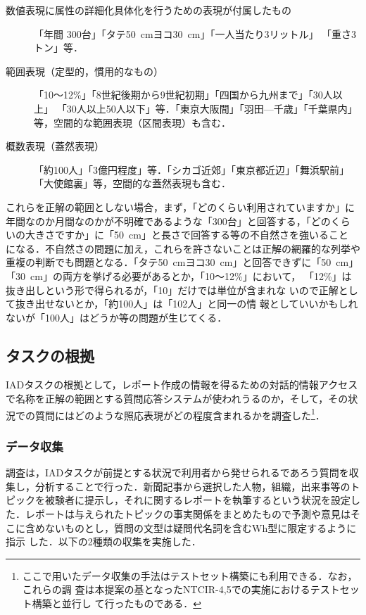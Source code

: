 \documentclass[japanese]{jnlp_1.4}
\begin{document}
\begin{description}
\item[数値表現に属性の詳細化具体化を行うための表現が付属したもの]「年間
	   300台」「タテ50~cmヨコ30~cm」「一人当たり3リットル」
	   「重さ3トン」等．
\item[範囲表現（定型的，慣用的なもの）]「10〜12\%」「8世紀後期から9世紀初期」「四国から九州まで」「30人以上」 「30人以上50人以下」等．「東京大阪間」「羽田—千歳」「千葉県内」等，空間的な範囲表現（区間表現）も含む．
\item[概数表現（蓋然表現）]「約100人」「3億円程度」等．「シカゴ近郊」「東京都近辺」「舞浜駅前」「大使館裏」等，空間的な蓋然表現も含む．
\end{description}

これらを正解の範囲としない場合，まず，「どのくらい利用されていますか」に
年間なのか月間なのかが不明確であるような「300台」と回答する，「どのくら
いの大きさですか」に「50~cm」と長さで回答する等の不自然さを強いること
になる．不自然さの問題に加え，これらを許さないことは正解の網羅的な列挙や
重複の判断でも問題となる．「タテ50~cmヨコ30~cm」と回答できずに「50~cm」「30~cm」の両方を挙げる必要があるとか，「10〜12\%」において，
「12\%」は抜き出しという形で得られるが，「10」だけでは単位が含まれな
いので正解として抜き出せないとか，「約100人」は「102人」と同一の情
報としていいかもしれないが「100人」はどうか等の問題が生じてくる．



\subsection{タスクの根拠} \label{Sec2_3}

IADタスクの根拠として，レポート作成の情報を得るための対話的情報アクセス
で名称を正解の範囲とする質問応答システムが使われうるのか，そして，その状
況での質問にはどのような照応表現がどの程度含まれるかを調査した\footnote{
	ここで用いたデータ収集の手法はテストセット構築にも利用できる．なお，これらの調
	査は本提案の基となったNTCIR-4,5での実施におけるテストセット構築と並行し
	て行ったものである．
}．


\subsubsection{データ収集}

調査は，IADタスクが前提とする状況で利用者から発せられるであろう質問を収
集し，分析することで行った．新聞記事から選択した人物，組織，出来事等のト
ピックを被験者に提示し，それに関するレポートを執筆するという状況を設定し
た．レポートは与えられたトピックの事実関係をまとめたもので予測や意見はそ
こに含めないものとし，質問の文型は疑問代名詞を含むWh型に限定するように指示
した．以下の2種類の収集を実施した．
\end{document}

